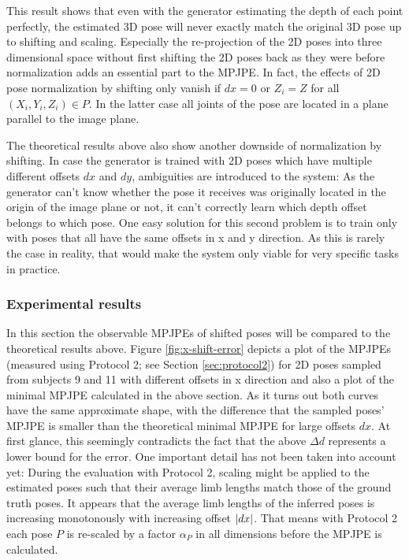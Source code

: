 This result shows that even with the generator estimating the depth of each point perfectly, the estimated 3D pose will never exactly match the original 3D pose up to shifting and scaling.
Especially the re-projection of the 2D poses into three dimensional space without first shifting the 2D poses back as they were before normalization adds an essential part to the MPJPE.
In fact, the effects of 2D pose normalization by shifting only vanish if $dx = 0$ or $Z_i = Z$ for all $(X_i, Y_i, Z_i) \in P$. In the latter case all joints of the pose are located in a plane parallel to the image plane.

The theoretical results above also show another downside of normalization by shifting.
In case the generator is trained with 2D poses which have multiple different offsets $dx$ and $dy$, ambiguities are introduced to the system:
As the generator can't know whether the pose it receives was originally located in the origin of the image plane or not, it can't correctly learn which depth offset belongs to which pose.
One easy solution for this second problem is to train only with poses that all have the same offsets in x and y direction.
As this is rarely the case in reality, that would make the system only viable for very specific tasks in practice.


\subsubsection{Experimental results}

In this section the observable MPJPEs of shifted poses will be compared to the theoretical results above. 
Figure \ref{fig:x-shift-error} depicts a plot of the MPJPEs (measured using Protocol 2; see Section \ref{sec:protocol2}) for 2D poses sampled from subjects 9 and 11 with different offsets in x direction and also a plot of the minimal MPJPE calculated in the above section.
As it turns out both curves have the same approximate shape, with the difference that the sampled poses' MPJPE is smaller than the theoretical minimal MPJPE for large offsets $dx$.
At first glance, this seemingly contradicts the fact that the above $\Delta d$ represents a lower bound for the error.
One important detail has not been taken into account yet:
During the evaluation with Protocol 2, scaling might be applied to the estimated poses such that their average limb lengths match those of the ground truth poses.
It appears that the average limb lengths of the inferred poses is increasing monotonously with increasing offset $\abs{dx}$.
That means with Protocol 2 each pose $P$ is re-scaled by a factor $\alpha_P$ in all dimensions before the MPJPE is calculated.

